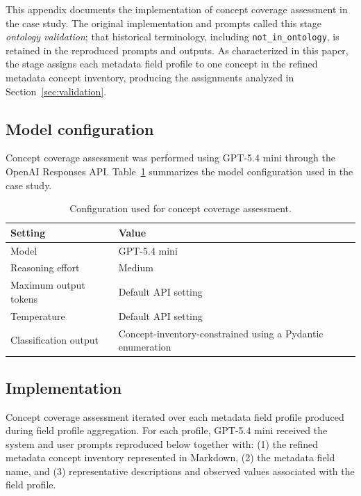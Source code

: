 \documentclass{article}
\begin{document}
This appendix documents the implementation of concept coverage assessment in the case study. The original implementation and prompts called this stage \emph{ontology validation}; that historical terminology, including \texttt{not\_in\_ontology}, is retained in the reproduced prompts and outputs. As characterized in this paper, the stage assigns each metadata field profile to one concept in the refined metadata concept inventory, producing the assignments analyzed in Section~\ref{sec:validation}.

\subsection{Model configuration}

Concept coverage assessment was performed using GPT-5.4 mini through the OpenAI Responses API. Table~\ref{tab:ontology_validation_configuration} summarizes the model configuration used in the case study.

\begin{table}[!ht]
    \centering
    \caption{Configuration used for concept coverage assessment.}
    \label{tab:ontology_validation_configuration}
    \begin{tabular}{ll}
    \toprule
    \textbf{Setting} & \textbf{Value} \\
    \midrule
    Model & GPT-5.4 mini \\
    Reasoning effort & Medium \\
    Maximum output tokens & Default API setting \\
    Temperature & Default API setting \\
    Classification output & Concept-inventory-constrained using a Pydantic enumeration \\
    \bottomrule
    \end{tabular}
\end{table}

\subsection{Implementation}

Concept coverage assessment iterated over each metadata field profile produced during field profile aggregation. For each profile, GPT-5.4 mini received the system and user prompts reproduced below together with: (1) the refined metadata concept inventory represented in Markdown, (2) the metadata field name, and (3) representative descriptions and observed values associated with the field profile.
\end{document}
